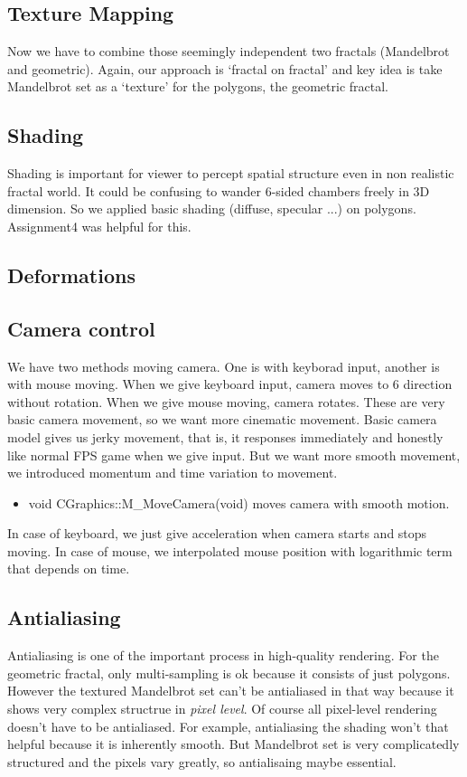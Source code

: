 \documentclass[a4paper]{article}
\begin{document}
\subsection{Texture Mapping}
Now we have to combine those seemingly independent two fractals (Mandelbrot and geometric).
Again, our approach is `fractal on fractal' and key idea is take Mandelbrot set as a `texture' for the polygons, the geometric fractal.



\subsection{Shading}
Shading is important for viewer to percept spatial structure even in non realistic fractal world.
It could be confusing to wander 6-sided chambers freely in 3D dimension.
So we applied basic shading (diffuse, specular ...) on polygons.
Assignment4 was helpful for this.

\subsection{Deformations}

\subsection{Camera control}
We have two methods moving camera.
One is with keyborad input, another is with mouse moving.
When we give keyboard input, camera moves to 6 direction without rotation.
When we give mouse moving, camera rotates.
These are very basic camera movement, so we want more cinematic movement.
Basic camera model gives us jerky movement, that is, it responses immediately and honestly like normal FPS game when we give input.
But we want more smooth movement, we introduced momentum and time variation to movement.
\begin{itemize}
  \item void CGraphics::M\_MoveCamera(void) moves camera with smooth motion.
\end{itemize}
In case of keyboard, we just give acceleration when camera starts and stops moving.
In case of mouse, we interpolated mouse position with logarithmic term that depends on time.

\subsection{Antialiasing}
Antialiasing is one of the important process in high-quality rendering.
For the geometric fractal, only multi-sampling is ok because it consists of just polygons.
However the textured Mandelbrot set can't be antialiased in that way because it shows very complex structrue in \textit{pixel level}.
Of course all pixel-level rendering doesn't have to be antialiased.
For example, antialiasing the shading won't that helpful because it is inherently smooth.
But Mandelbrot set is very complicatedly structured and the pixels vary greatly, so antialisaing maybe essential.
\end{document}
